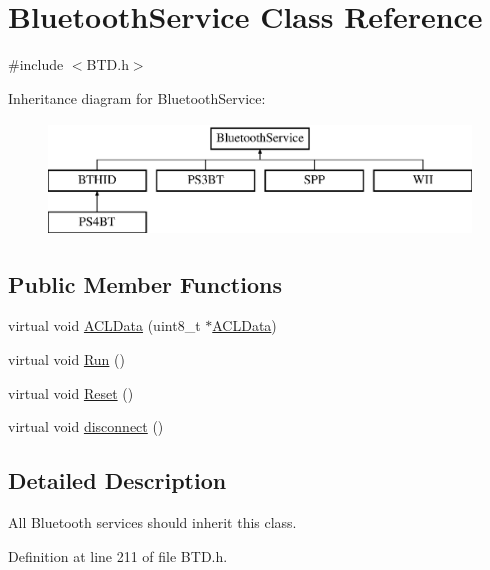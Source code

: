 \hypertarget{class_bluetooth_service}{\section{\-Bluetooth\-Service \-Class \-Reference}
\label{class_bluetooth_service}
}


{\ttfamily \#include $<$\-B\-T\-D.\-h$>$}

\-Inheritance diagram for \-Bluetooth\-Service\-:\begin{figure}[H]
\begin{center}
\leavevmode
\includegraphics[height=3.000000cm]{class_bluetooth_service}
\end{center}
\end{figure}
\subsection*{\-Public \-Member \-Functions}
\begin{DoxyCompactItemize}
\item 
virtual void \hyperlink{class_bluetooth_service_a8dc98310fe481357eaa86c53e49af113}{\-A\-C\-L\-Data} (uint8\-\_\-t $\ast$\hyperlink{class_bluetooth_service_a8dc98310fe481357eaa86c53e49af113}{\-A\-C\-L\-Data})
\item 
virtual void \hyperlink{class_bluetooth_service_a680692ff13cb37eb81ddbb74bc9e0383}{\-Run} ()
\item 
virtual void \hyperlink{class_bluetooth_service_a1dff7caf251f1d8a5f358b368445cb48}{\-Reset} ()
\item 
virtual void \hyperlink{class_bluetooth_service_a66ee2f09c6087b82e3920c3d652a99b2}{disconnect} ()
\end{DoxyCompactItemize}


\subsection{\-Detailed \-Description}
\-All \-Bluetooth services should inherit this class. 

\-Definition at line 211 of file \-B\-T\-D.\-h.



